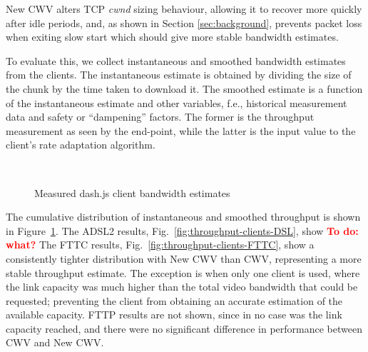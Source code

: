 \documentclass[10pt,sigconf]{acmart}
\newcommand{\todo}[1]{\textbf{\textcolor{red}{To do: #1}}}
\begin{document}
New CWV alters TCP \emph{cwnd} sizing behaviour, allowing it to recover more quickly after idle periods, and, as shown in Section \ref{sec:background}, prevents packet loss when exiting slow start which should give more stable bandwidth estimates. 

To evaluate this, we collect instantaneous and smoothed bandwidth estimates from the clients. The instantaneous estimate is obtained by dividing the size of the chunk by the time taken to download it. The smoothed estimate is a function of the instantaneous estimate and other variables, f.e., historical measurement data and safety or ``dampening'' factors. The former is the throughput measurement as seen by the end-point, while the latter is the input value to the client's rate adaptation algorithm.

\begin{figure}[t!]
  \centering
  \\
  \caption{Measured dash.js client bandwidth estimates}
  \label{fig:throughput-clients}
\end{figure}

The cumulative distribution of instantaneous and smoothed throughput is shown in 
Figure~\ref{fig:throughput-clients}. 
%
The ADSL2 results, Fig.\ \ref{fig:throughput-clients-DSL}, show \todo{what?}
%
The FTTC results, Fig.\ \ref{fig:throughput-clients-FTTC}, show a consistently tighter distribution with New CWV than CWV, representing a more stable throughput estimate. The exception is when only one client is used, where the link capacity was much higher than the total video bandwidth that could be requested; preventing the client from obtaining an accurate estimation of the available capacity.
%
FTTP results are not shown, since in no case was the link capacity reached, and there were no significant difference in performance between CWV and New CWV.
\end{document}
